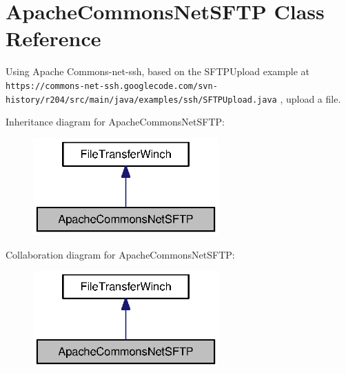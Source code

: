 \section{Apache\+Commons\+Net\+S\+F\+T\+P Class Reference}
\label{classorg_1_1smallfoot_1_1filexfer_1_1ApacheCommonsNetSFTP}


Using Apache Commons-\/net-\/ssh, based on the S\+F\+T\+P\+Upload example at {\tt https\+://commons-\/net-\/ssh.\+googlecode.\+com/svn-\/history/r204/src/main/java/examples/ssh/\+S\+F\+T\+P\+Upload.\+java} , upload a file.  




Inheritance diagram for Apache\+Commons\+Net\+S\+F\+T\+P\+:\nopagebreak
\begin{figure}[H]
\begin{center}
\leavevmode
\includegraphics[width=202pt]{classorg_1_1smallfoot_1_1filexfer_1_1ApacheCommonsNetSFTP__inherit__graph}
\end{center}
\end{figure}


Collaboration diagram for Apache\+Commons\+Net\+S\+F\+T\+P\+:\nopagebreak
\begin{figure}[H]
\begin{center}
\leavevmode
\includegraphics[width=202pt]{classorg_1_1smallfoot_1_1filexfer_1_1ApacheCommonsNetSFTP__coll__graph}
\end{center}
\end{figure}
